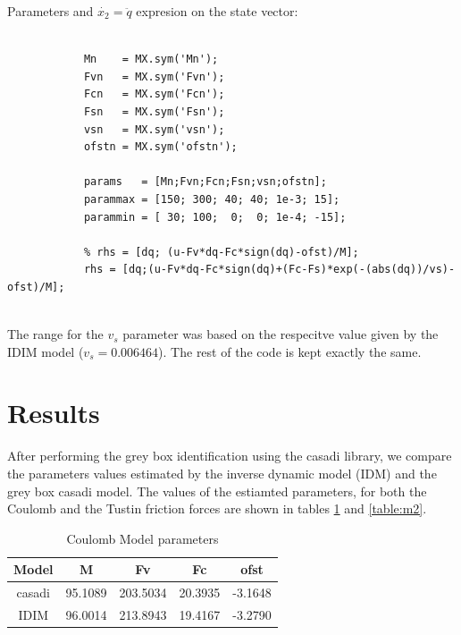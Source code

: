 \documentclass[10pt, a4paper]{article}
\begin{document}
Parameters and $\dot{x_{2}}=\ddot{q}$ expresion on the state vector: \\ \\
\begin{adjustbox}{max width=\textwidth}
      \begin{lstlisting}
            Mn    = MX.sym('Mn');
            Fvn   = MX.sym('Fvn');
            Fcn   = MX.sym('Fcn');
            Fsn   = MX.sym('Fsn');
            vsn   = MX.sym('vsn');
            ofstn = MX.sym('ofstn');

            params   = [Mn;Fvn;Fcn;Fsn;vsn;ofstn];
            parammax = [150; 300; 40; 40; 1e-3; 15];
            parammin = [ 30; 100;  0;  0; 1e-4; -15];

            % rhs = [dq; (u-Fv*dq-Fc*sign(dq)-ofst)/M];
            rhs = [dq;(u-Fv*dq-Fc*sign(dq)+(Fc-Fs)*exp(-(abs(dq))/vs)-ofst)/M];
      \end{lstlisting}
\end{adjustbox} \\

The range for the $v_{s}$ parameter was based on the respecitve value given by the IDIM model ($v_{s} = 0.006464$). The rest of the code is kept exactly the same.

\newpage

\section{Results}

After performing the grey box identification using the casadi library, we compare the parameters values estimated by the inverse dynamic model (IDM) and the grey box casadi model. The values of the estiamted parameters, for both the Coulomb and the Tustin friction forces are shown in tables \ref{table:m1} and \ref{table:m2}.

\begin{table}[H]
      \small
      \centering
      \caption{Coulomb Model parameters}
      \begin{tabular}{c|c|c|c|c}
            Model &  M & Fv & Fc & ofst \\
            \hline
            casadi & 95.1089 & 203.5034 & 20.3935 & -3.1648 \\
            IDIM   & 96.0014 & 213.8943 & 19.4167 & -3.2790 \\
      \end{tabular}
      \label{table:m1}
\end{table}
\end{document}
